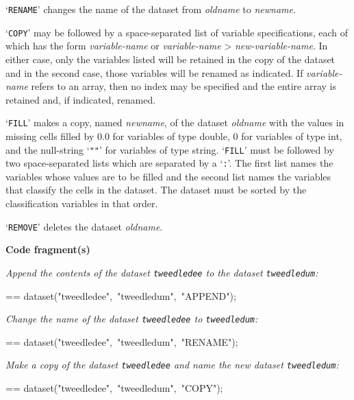 \documentclass{book}
\makeatletter
\newcommand\Texinfocommandstyletextvar[1]{{\normalfont{}\textsl{#1}}}%
\newenvironment{Texinfopreformatted}{%
  \par\GNUTobeylines\obeyspaces\frenchspacing\parskip=\z@\parindent=\z@}{}
{\catcode`\^^M=13 \gdef\GNUTobeylines{\catcode`\^^M=13 \def^^M{\null\par}}}
\newenvironment{Texinfoindented}{\begin{list}{}{}\item\relax}{\end{list}}
\renewcommand{\_}{\Texinfounderscore\discretionary{}{}{}}
\makeatother
\begin{document}
`\texttt{RENAME}' changes the name of the dataset from \Texinfocommandstyletextvar{oldname} to \Texinfocommandstyletextvar{newname}.

`\texttt{COPY}' may be followed by a space-separated list
of variable specifications, each of
which has the form \Texinfocommandstyletextvar{variable-name} or \Texinfocommandstyletextvar{variable-name}
> \Texinfocommandstyletextvar{new-variable-name}. In either case, only the variables listed will be retained in
the copy of the dataset and in the second case, those variables will be renamed as
indicated. If \Texinfocommandstyletextvar{variable-name} refers to an array, then no index may be specified and
the entire array is retained and, if indicated, renamed.

`\texttt{FILL}' makes a copy, named \Texinfocommandstyletextvar{newname}, of the dataset \Texinfocommandstyletextvar{oldname}
with the values in missing cells filled by 0.0 for variables of type double,
0 for variables of type int, and the null-string `\texttt{""}'
for variables of type string.
`\texttt{FILL}' must be followed by two space-separated lists which are separated by a
`\texttt{:}'. The first list names the variables whose values are to be filled and
the second list names the variables that classify the cells in the dataset.
The dataset must be sorted by the classification variables in that order.

`\texttt{REMOVE}' deletes the dataset \Texinfocommandstyletextvar{oldname}.

\noindent{}\textbf{Code fragment(s)}

\emph{Append the contents of the dataset \texttt{tweedledee} to
the dataset \texttt{tweedledum}:}
\begin{Texinfoindented}
\begin{Texinfopreformatted}%
\ttfamily dataset("tweedledee",\ "tweedledum",\ "APPEND");
\end{Texinfopreformatted}
\end{Texinfoindented}

\emph{Change the name of the dataset \texttt{tweedledee} to
\texttt{tweedledum}:}
\begin{Texinfoindented}
\begin{Texinfopreformatted}%
\ttfamily dataset("tweedledee",\ "tweedledum",\ "RENAME");
\end{Texinfopreformatted}
\end{Texinfoindented}

\emph{Make a copy of the dataset \texttt{tweedledee} and name the new
dataset \texttt{tweedledum}:}
\begin{Texinfoindented}
\begin{Texinfopreformatted}%
\ttfamily dataset("tweedledee",\ "tweedledum",\ "COPY");
\end{Texinfopreformatted}
\end{Texinfoindented}
\end{document}
